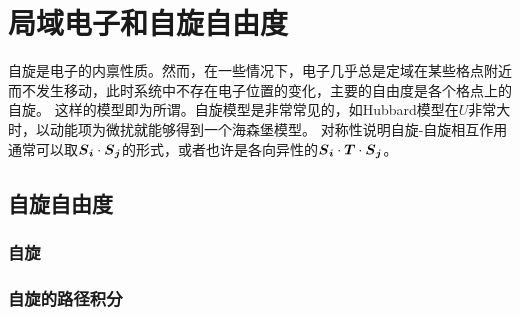 \chapter{局域电子和自旋自由度}

自旋是电子的内禀性质。然而，在一些情况下，电子几乎总是定域在某些格点附近而不发生移动，此时系统中不存在电子位置的变化，主要的自由度是各个格点上的自旋。
这样的模型即为所谓。自旋模型是非常常见的，如Hubbard模型在$U$非常大时，以动能项为微扰就能够得到一个海森堡模型。
对称性说明自旋-自旋相互作用通常可以取$\vb*{S}_{\vb*{i}} \cdot \vb*{S}_{\vb*{j}}$的形式，或者也许是各向异性的$\vb*{S}_{\vb*{i}} \cdot \vb*{T} \cdot \vb*{S}_{\vb*{j}}$。

\section{自旋自由度}

\subsection{自旋}

\subsection{自旋的路径积分}

